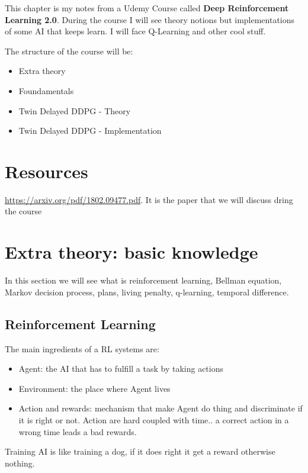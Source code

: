This chapter is my notes from a Udemy Course called \textbf{Deep Reinforcement Learning 2.0}. During the course I will see theory notions but implementations of some AI that keeps learn. I will face Q-Learning and other cool stuff.

The structure of the course will be:
\begin{itemize}
\item Extra theory
\item Foundamentals
\item Twin Delayed DDPG - Theory
\item Twin Delayed DDPG - Implementation
\end{itemize}

\section{Resources}
\url{https://arxiv.org/pdf/1802.09477.pdf}. It is the paper that we will discuss dring the course


\section{Extra theory: basic knowledge}

In this section we will see what is reinforcement learning, Bellman equation, Markov decision process, plans,  living penalty, q-learning, temporal difference.

\subsection{Reinforcement Learning}
 The main ingredients of a RL systems are:
 \begin{itemize}
 \item Agent: the AI that has to fulfill  a task by taking actions
 \item Environment: the place where Agent lives
 \item Action and rewards: mechanism that make Agent do thing and discriminate if it is right or not. Action are hard coupled with time.. a correct action in a wrong time leads a bad rewards.
 \end{itemize}
 
 Training AI is like training a dog, if it does right it get a reward otherwise nothing.
 
